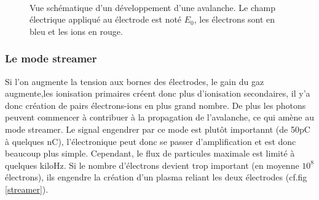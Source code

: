 \begin{figure}[ht!]
\centering
{}
\hfill
{}
\\
\hfill
{}
\caption{Vue schématique d'un développement d'une avalanche. Le champ électrique appliqué au électrode est noté $E_{0}$, les électrons sont en bleu et les ions en rouge.}
\label{avalanche}
\end{figure}

\subsubsection{Le mode streamer}
Si l'on augmente la tension aux bornes des électrodes, le gain du gaz augmente,les ionisation primaires créent donc plus d'ionisation secondaires, il y'a donc création de pairs électrons-ions  en plus grand nombre. De plus les photons peuvent commencer à contribuer à la propagation de l'avalanche, ce qui amène au mode streamer. Le signal engendrer par ce mode est plutôt importannt (de 50pC à quelques nC), l'électronique peut donc se passer d'amplification et est donc beaucoup plus simple. Cependant, le flux de particules maximale est limité à quelques kiloHz. Si le nombre d'électrons devient trop important (en moyenne $10^{8}$ électrons), ils engendre la création d'un plasma reliant les deux électrodes (cf.fig \ref{streamer}).

